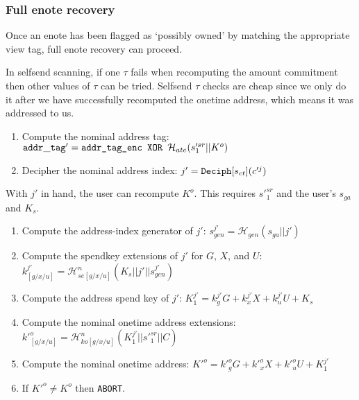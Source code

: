 \subsubsection{Full enote recovery}
\label{subsubsec:jamtis-balance-recovery-enote}

Once an enote has been flagged as `possibly owned' by matching the appropriate view tag, full enote recovery can proceed.

In selfsend scanning, if one $\tau$ fails when recomputing the amount commitment then other values of $\tau$ can be tried. Selfsend $\tau$ checks are cheap since we only do it after we have successfully recomputed the onetime address, which means it was addressed to us.

\begin{enumerate}
    \item Compute the nominal address tag: ${\tt addr\_tag}' = \textrm{\tt addr\_tag\_enc XOR } \mathcal{H}_{ate}(s'^{sr}_1 || K^o)$

    \item Decipher the nominal address index: $j' = {\tt Deciph}[s_{ct}](c'^j)$
\end{enumerate}

With $j'$ in hand, the user can recompute $K^o$. This requires $s'^{sr}_1$ and the user's $s_{ga}$ and $K_s$.

\begin{enumerate}
    \item Compute the address-index generator of $j'$: $s^{j'}_{gen} =  \mathcal{H}_{gen}(s_{ga} || j')$

    \item Compute the spendkey extensions of $j'$ for $G$, $X$, and $U$: $k^{j'}_{[g/x/u]} = \mathcal{H}^n_{se[g/x/u]}(K_s || j' || s^{j'}_{gen})$

    \item Compute the address spend key of $j'$: $K^{j'}_1 = k^{j'}_g G + k^{j'}_x X + k^{j'}_u U + K_s$

    \item Compute the nominal onetime address extensions: $k'^o_{[g/x/u]} = \mathcal{H}^n_{ko[g/x/u]}(K^{j'}_1 || s'^{sr}_1 || C)$

    \item Compute the nominal onetime address: $K'^o = k'^o_g G + k'^o_x X + k'^o_u U + K^{j'}_1$

    \item If $K'^o \neq K^o$ then {\tt ABORT}.
\end{enumerate}

